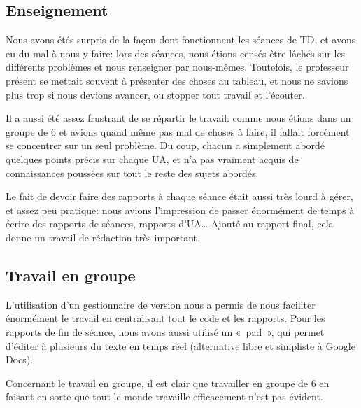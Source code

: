 
\subsection{Enseignement}

Nous avons étés surpris de la façon dont fonctionnent
les séances de TD, et avons eu du mal à nous y faire:
lors des séances, nous étions censés être lâchés sur les
différents problèmes et nous renseigner par nous-mêmes.
Toutefois, le professeur présent se mettait souvent à présenter
des choses au tableau, et nous ne savions plus trop si nous
devions avancer, ou stopper tout travail et l'écouter.

Il a aussi été assez frustrant de se répartir le travail:
comme nous étions dans un groupe de 6 et avions quand même
pas mal de choses à faire, il fallait forcément se concentrer
sur un seul problème. Du coup, chacun a simplement abordé
quelques points précis sur chaque UA, et n'a pas vraiment acquis de
connaissances poussées sur tout le reste des sujets abordés.

Le fait de devoir faire des rapports à chaque séance était aussi
très lourd à gérer, et assez peu pratique: nous avions l'impression
de passer énormément de temps à écrire des rapports de séances,
rapports d'UA\dots{} Ajouté au rapport final, cela donne un travail
de rédaction très important.

\subsection{Travail en groupe} %

L'utilisation d'un gestionnaire de version nous a permis de nous faciliter
énormément le travail en centralisant tout le code et les rapports.  Pour les
rapports de fin de séance, nous avons aussi utilisé un «~pad~», qui permet
d'éditer à plusieurs du texte en temps réel (alternative libre et
simpliste à Google Docs).

Concernant le travail en groupe, il est clair que travailler en groupe de 6
en faisant en sorte que tout le monde travaille efficacement n'est pas évident.


